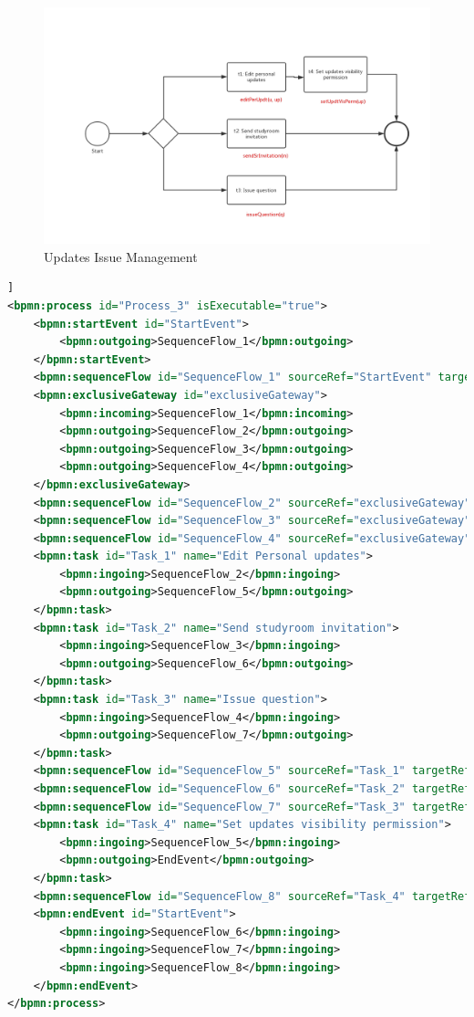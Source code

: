 \documentclass[runningheads]{llncs}
\begin{document}
\begin{figure}[H]
		\centering %
		\includegraphics[width=1.0\textwidth]{./figure/PMZ/update} %
		\caption{Updates Issue Management} %
		\label{up} %
	\end{figure}
\begin{lstlisting}[language={XML}]]
<bpmn:process id="Process_3" isExecutable="true">
	<bpmn:startEvent id="StartEvent">
        <bpmn:outgoing>SequenceFlow_1</bpmn:outgoing>
    </bpmn:startEvent>
    <bpmn:sequenceFlow id="SequenceFlow_1" sourceRef="StartEvent" targetRef="exclusiveGateway" />
    <bpmn:exclusiveGateway id="exclusiveGateway">
        <bpmn:incoming>SequenceFlow_1</bpmn:incoming>
        <bpmn:outgoing>SequenceFlow_2</bpmn:outgoing>
        <bpmn:outgoing>SequenceFlow_3</bpmn:outgoing>
        <bpmn:outgoing>SequenceFlow_4</bpmn:outgoing>
    </bpmn:exclusiveGateway>
    <bpmn:sequenceFlow id="SequenceFlow_2" sourceRef="exclusiveGateway" targetRef="Task_1" />
    <bpmn:sequenceFlow id="SequenceFlow_3" sourceRef="exclusiveGateway" targetRef="Task_2" />
    <bpmn:sequenceFlow id="SequenceFlow_4" sourceRef="exclusiveGateway" targetRef="Task_3" />
    <bpmn:task id="Task_1" name="Edit Personal updates">
    	<bpmn:ingoing>SequenceFlow_2</bpmn:ingoing>
    	<bpmn:outgoing>SequenceFlow_5</bpmn:outgoing>
    </bpmn:task>
    <bpmn:task id="Task_2" name="Send studyroom invitation">
    	<bpmn:ingoing>SequenceFlow_3</bpmn:ingoing>
    	<bpmn:outgoing>SequenceFlow_6</bpmn:outgoing>
    </bpmn:task>
    <bpmn:task id="Task_3" name="Issue question">
    	<bpmn:ingoing>SequenceFlow_4</bpmn:ingoing>
    	<bpmn:outgoing>SequenceFlow_7</bpmn:outgoing>
    </bpmn:task>
    <bpmn:sequenceFlow id="SequenceFlow_5" sourceRef="Task_1" targetRef="Task_4" />
    <bpmn:sequenceFlow id="SequenceFlow_6" sourceRef="Task_2" targetRef="EndEvent" />
    <bpmn:sequenceFlow id="SequenceFlow_7" sourceRef="Task_3" targetRef="EndEvent" />
    <bpmn:task id="Task_4" name="Set updates visibility permission">
    	<bpmn:ingoing>SequenceFlow_5</bpmn:ingoing>
    	<bpmn:outgoing>EndEvent</bpmn:outgoing>
    </bpmn:task>
    <bpmn:sequenceFlow id="SequenceFlow_8" sourceRef="Task_4" targetRef="EndEvent" />
    <bpmn:endEvent id="StartEvent">
        <bpmn:ingoing>SequenceFlow_6</bpmn:ingoing>
        <bpmn:ingoing>SequenceFlow_7</bpmn:ingoing>
        <bpmn:ingoing>SequenceFlow_8</bpmn:ingoing>
    </bpmn:endEvent>
</bpmn:process>
\end{lstlisting}
\end{document}
